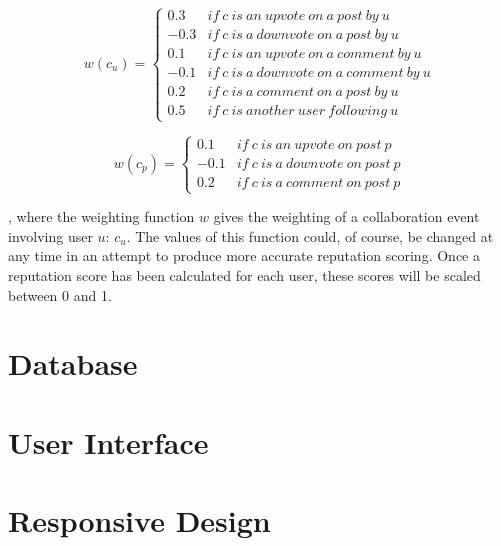 \begin{equation}
	\label{eq:rep_weight_user}
		w(c_u) = \left\{\begin{matrix}
			0.3 & if\ c\ is\ an\ upvote\ on\ a\ post\ by\ u\\ 
			-0.3 & if\ c\ is\ a\ downvote\ on\ a\ post\ by\ u \\ 
			0.1 & if\ c\ is\ an\ upvote\ on\ a\ comment\ by\ u \\ 
			-0.1 & if\ c\ is\ a\ downvote\ on\ a\ comment\ by\ u \\ 
			0.2 & if\ c\ is\ a\ comment\ on\ a\ post\ by\ u\\ 
			0.5 & if\ c\ is\ another\ user\ following\ u
		\end{matrix}\right.
\end{equation}
		
\begin{equation}
	\label{eq:rep_weight_post}
	 w(c_p) = \left\{\begin{matrix}
			0.1 & if\ c\ is\ an\ upvote\ on\ post\ p \\ 
			-0.1 & if\ c\ is\ a\ downvote\ on\ post\ p \\ 
			0.2 & if\ c\ is\ a\ comment\ on\ post\ p
	\end{matrix}\right.
\end{equation}

\noindent
, where the weighting function \(w\) gives the weighting of a collaboration event involving user \(u\): \(c_u\). The values of this function could, of course, be changed at any time in an attempt to produce more accurate reputation scoring. Once a reputation score has been calculated for each user, these scores will be scaled between 0 and 1.

\section{Database}

\section{User Interface}

\section{Responsive Design}